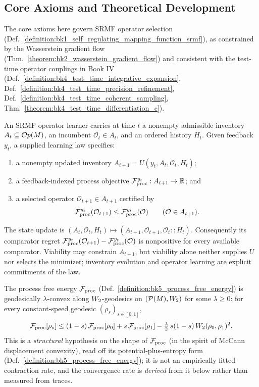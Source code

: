 \subsection{Core Axioms and Theoretical Development}
\label{subsec:bk5_srmf_core_axioms}
The core axioms here govern SRMF operator selection (Def.~\ref{definition:bk1_self_regulating_mapping_function_srmf}), as constrained by the Wasserstein gradient flow (Thm.~\ref{theorem:bk2_wasserstein_gradient_flow}) and consistent with the test-time operator couplings in Book IV (Def.~\ref{definition:bk4_test_time_integrative_expansion}, Def.~\ref{definition:bk4_test_time_precision_refinement}, Def.~\ref{definition:bk4_test_time_coherent_sampling}, Thm.~\ref{theorem:bk4_test_time_differentiation_c}).
\begin{axiom} \label{axiom:bk5_srmf_operator_selection_evolution}
An SRMF operator learner carries at time $t$ a nonempty admissible inventory
$A_t\subseteq\mathcal{O}p(M)$, an incumbent $\mathcal O_t\in A_t$, and an ordered
history $H_t$.  Given feedback $y_t$, a supplied learning law specifies:
\begin{enumerate}
  \item a nonempty updated inventory $A_{t+1}=U(y_t,A_t,\mathcal O_t,H_t)$;
  \item a feedback-indexed process objective
  $\mathcal{F}_{\text{proc}}^{y_t}:A_{t+1}\to\mathbb R$; and
  \item a selected operator $\mathcal O_{t+1}\in A_{t+1}$ certified by
  \[
    \mathcal{F}_{\text{proc}}^{y_t}(\mathcal O_{t+1})
    \le \mathcal{F}_{\text{proc}}^{y_t}(\mathcal O)
    \qquad(\mathcal O\in A_{t+1}).
  \]
\end{enumerate}
The state update is
$(A_t,\mathcal O_t,H_t)\mapsto
(A_{t+1},\mathcal O_{t+1},\mathcal O_t::H_t)$.
Consequently its comparator regret
$\mathcal{F}_{\text{proc}}^{y_t}(\mathcal O_{t+1})-\mathcal{F}_{\text{proc}}^{y_t}(\mathcal O)$ is nonpositive for
every available comparator. Viability may constrain $A_{t+1}$, but viability
alone neither supplies $U$ nor selects the minimizer; inventory evolution and
operator learning are explicit commitments of the law.
\end{axiom}
\begin{assumption}
\label{assumption:bk5_displacement_convexity}
The process free energy $\mathcal{F}_{\text{proc}}$ (Def.~\ref{definition:bk5_process_free_energy}) is geodesically $\lambda$-convex along $W_2$-geodesics on $(\mathcal{P}(M),W_2)$ for some $\lambda \ge 0$: for every constant-speed geodesic $(\rho_s)_{s\in[0,1]}$,
\[
\mathcal{F}_{\text{proc}}[\rho_s] \le (1-s)\,\mathcal{F}_{\text{proc}}[\rho_0] + s\,\mathcal{F}_{\text{proc}}[\rho_1] - \tfrac{\lambda}{2}\,s(1-s)\,W_2(\rho_0,\rho_1)^2 .
\]
This is a \emph{structural} hypothesis on the shape of $\mathcal{F}_{\text{proc}}$ (in the spirit of McCann displacement convexity), read off its potential-plus-entropy form (Def.~\ref{definition:bk5_process_free_energy}); it is not an empirically fitted contraction rate, and the convergence rate is \emph{derived} from it below rather than measured from traces.
\end{assumption}
